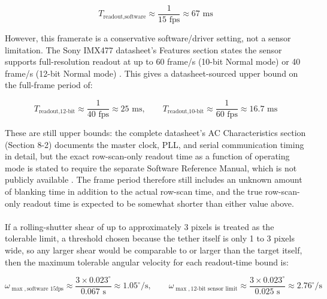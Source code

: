 \begin{equation}
T_{\text{readout,software}} \approx \frac{1}{15\text{ fps}} \approx 67\text{ ms}
\end{equation}

However, this framerate is a conservative software/driver setting, not a sensor limitation. The Sony IMX477 datasheet's Features section states the sensor supports full-resolution readout at up to 60 frame/s (10-bit Normal mode) or 40 frame/s (12-bit Normal mode) \cite{sony_imx477_datasheet}. This gives a datasheet-sourced upper bound on the full-frame period of:

\begin{equation}
T_{\text{readout,12-bit}} \approx \frac{1}{40\text{ fps}} \approx 25\text{ ms}, \qquad
T_{\text{readout,10-bit}} \approx \frac{1}{60\text{ fps}} \approx 16.7\text{ ms}
\end{equation}

These are still upper bounds: the complete datasheet's AC Characteristics section (Section 8-2) documents the master clock, PLL, and serial communication timing in detail, but the exact row-scan-only readout time as a function of operating mode is stated to require the separate Software Reference Manual, which is not publicly available \cite{sony_imx477_datasheet}. The frame period therefore still includes an unknown amount of blanking time in addition to the actual row-scan time, and the true row-scan-only readout time is expected to be somewhat shorter than either value above. 
\\\\
If a rolling-shutter shear of up to approximately 3 pixels is treated as the tolerable limit, a threshold chosen because the tether itself is only 1 to 3 pixels wide, so any larger shear would be comparable to or larger than the target itself, then the maximum tolerable angular velocity for each readout-time bound is:

\begin{equation}
\omega_{\max,\text{software 15fps}} \approx \frac{3 \times 0.023^\circ}{0.067\text{ s}} \approx 1.05^\circ/\text{s}, \qquad
\omega_{\max,\text{12-bit sensor limit}} \approx \frac{3 \times 0.023^\circ}{0.025\text{ s}} \approx 2.76^\circ/\text{s}
\end{equation}

